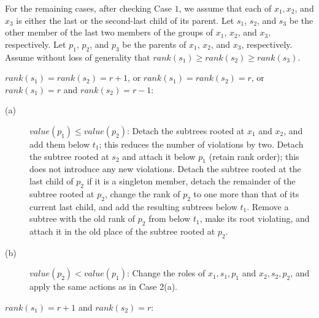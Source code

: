 \documentclass{llncs}
\newcommand{\rank}{\mbox{$\mathit{rank}$}}
\begin{document}
For the remaining cases, after checking Case $1$, we assume that each of $x_1,x_2$, and $x_3$ 
is either the last or the second-last child of its parent.
Let $s_1$, $s_2$, and $s_3$ be the other member of the last two
members of the groups of $x_1$, $x_2$, and $x_3$, respectively. Let
$p_1$, $p_2$, and $p_3$ be the parents of $x_1$, $x_2$, and $x_3$,
respectively.  Assume without loss of generality that $\rank{}(s_1)
\geq \rank{}(s_2) \geq \rank{}(s_3)$.

\begin{description}
\vspace{-.1in}
\item[Case 2.] 
$\rank{}(s_1) = \rank{}(s_2) = r+1$, or $\rank{}(s_1) = \rank{}(s_2) = r$, 
or $\rank{}(s_1) = r$ and $\rank{}(s_2) = r-1$: 

\begin{description}
\item[(a)] $value(p_1) \leq value(p_2)$: Detach the subtrees rooted at $x_1$ and $x_2$, and add
  them below $t_1$; this reduces the number of violations by two. 
  Detach the subtree rooted at $s_2$ and attach it below $p_1$ (retain rank order); this does not introduce any new violations.
  Detach the subtree rooted at the last child of $p_2$ if it is a singleton member, detach the remainder of the subtree rooted at $p_2$, 
  change the rank of $p_2$ to one more than that of its current last child, 
  and add the resulting subtrees below $t_1$. Remove a subtree with the old rank
  of $p_2$ from below $t_1$, make its root violating, and attach it in the old
  place of the subtree rooted at $p_2$.
\item[(b)] $value(p_2) < value(p_1)$: Change the roles of $x_1,s_1,p_1$
  and $x_2,s_2,p_2$, and apply the same actions as in Case 2(a). 
\end{description}

\item[Case 3.]
$\rank{}(s_1) = r+1$ and $\rank{}(s_2) = r$: 


\end{description}
\end{document}
